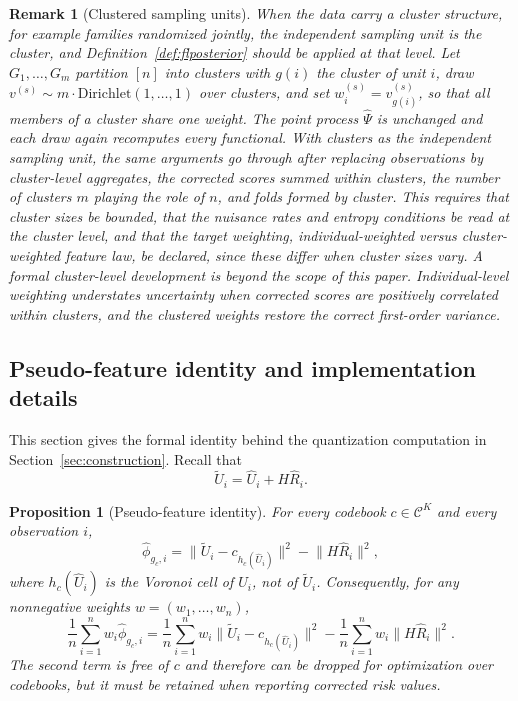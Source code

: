 \documentclass[11pt]{article}
\newtheorem{proposition}{Proposition}
\newtheorem{remark}{Remark}
\newcommand{\calC}{\mathcal C}
\newcommand{\hU}{\widehat U}
\newcommand{\tU}{\widetilde U}
\newcommand{\hR}{\widehat R}
\newcommand{\hPsi}{\widehat\Psi}
\newcommand{\hphi}{\widehat\phi}
\begin{document}
\begin{remark}[Clustered sampling units]\label{rem:clustered}
When the data carry a cluster structure, for example families randomized jointly, the independent sampling unit is the cluster, and Definition~\ref{def:flposterior} should be applied at that level. Let $G_1,\dots,G_m$ partition $[n]$ into clusters with $g(i)$ the cluster of unit $i$, draw $v^{(s)}\sim m\cdot\mathrm{Dirichlet}(1,\dots,1)$ over clusters, and set $w^{(s)}_i=v^{(s)}_{g(i)}$, so that all members of a cluster share one weight. The point process $\hPsi$ is unchanged and each draw again recomputes every functional. With clusters as the independent sampling unit, the same arguments go through after replacing observations by cluster-level aggregates, the corrected scores summed within clusters, the number of clusters $m$ playing the role of $n$, and folds formed by cluster. This requires that cluster sizes be bounded, that the nuisance rates and entropy conditions be read at the cluster level, and that the target weighting, individual-weighted versus cluster-weighted feature law, be declared, since these differ when cluster sizes vary. A formal cluster-level development is beyond the scope of this paper. Individual-level weighting understates uncertainty when corrected scores are positively correlated within clusters, and the clustered weights restore the correct first-order variance.
\end{remark}


\subsection{Pseudo-feature identity and implementation details}\label{sec:pseudo_supp}

This section gives the formal identity behind the quantization computation in Section~\ref{sec:construction}.  Recall that
\begin{equation}\label{eq:pseudofeature}
\tU_i=\hU_i+H\hR_i .
\end{equation}

\begin{proposition}[Pseudo-feature identity]\label{prop:pseudo}
For every codebook $c\in\calC^K$ and every observation $i$,
\begin{equation}\label{eq:pseudoidentity}
\hphi_{g_c,i}
=
\bigl\|\tU_i-c_{h_c(\hU_i)}\bigr\|^2
-
\bigl\|H\hR_i\bigr\|^2,
\end{equation}
where $h_c(\hU_i)$ is the Voronoi cell of $\hU_i$, not of $\tU_i$.  Consequently, for any nonnegative weights $w=(w_1,\dots,w_n)$,
\begin{equation}\label{eq:pseudoweighted}
\frac1n\sum_{i=1}^n w_i\hphi_{g_c,i}
=
\frac1n\sum_{i=1}^n w_i
\bigl\|\tU_i-c_{h_c(\hU_i)}\bigr\|^2
-
\frac1n\sum_{i=1}^n w_i
\bigl\|H\hR_i\bigr\|^2 .
\end{equation}
The second term is free of $c$ and therefore can be dropped for optimization over codebooks, but it must be retained when reporting corrected risk values.
\end{proposition}
\end{document}
